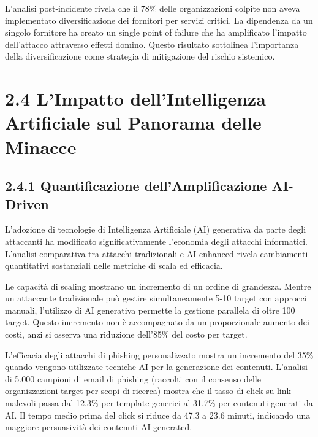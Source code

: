 L'analisi post-incidente rivela che il 78\% delle organizzazioni colpite
non aveva implementato diversificazione dei fornitori per servizi
critici. La dipendenza da un singolo fornitore ha creato un single point
of failure che ha amplificato l'impatto dell'attacco attraverso effetti
domino. Questo risultato sottolinea l'importanza della diversificazione
come strategia di mitigazione del rischio sistemico.

\section{\texorpdfstring{2.4 L'Impatto dell'Intelligenza Artificiale sul Panorama delle Minacce}{2.4 L'Impatto dell'Intelligenza Artificiale sul Panorama delle Minacce}}\label{limpatto-dellintelligenza-artificiale-sul-panorama-delle-minacce}

\subsection{\texorpdfstring{2.4.1 Quantificazione dell'Amplificazione AI-Driven}{2.4.1 Quantificazione dell'Amplificazione AI-Driven}}\label{quantificazione-dellamplificazione-ai-driven}

L'adozione di tecnologie di Intelligenza Artificiale (AI) generativa da
parte degli attaccanti ha modificato significativamente l'economia degli
attacchi informatici. L'analisi comparativa tra attacchi tradizionali e
AI-enhanced rivela cambiamenti quantitativi sostanziali nelle metriche
di scala ed efficacia.

Le capacità di scaling mostrano un incremento di un ordine di grandezza.
Mentre un attaccante tradizionale può gestire simultaneamente 5-10
target con approcci manuali, l'utilizzo di AI generativa permette la
gestione parallela di oltre 100 target. Questo incremento non è
accompagnato da un proporzionale aumento dei costi, anzi si osserva una
riduzione dell'85\% del costo per target\supercite{proofpoint2024social}.

L'efficacia degli attacchi di phishing personalizzato mostra un
incremento del 35\% quando vengono utilizzate tecniche AI per la
generazione dei contenuti. L'analisi di 5.000 campioni di email di
phishing (raccolti con il consenso delle organizzazioni target per scopi
di ricerca) mostra che il tasso di click su link malevoli passa dal
12.3\% per template generici al 31.7\% per contenuti generati da AI. Il
tempo medio prima del click si riduce da 47.3 a 23.6 minuti, indicando
una maggiore persuasività dei contenuti AI-generated.

